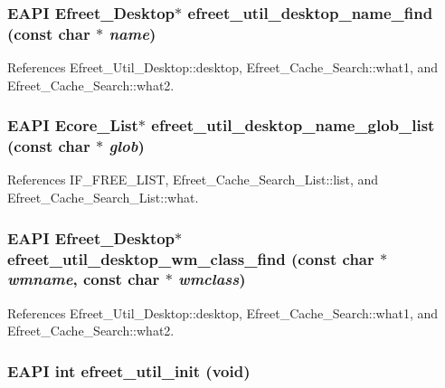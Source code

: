 \subsubsection{\setlength{\rightskip}{0pt plus 5cm}EAPI {\bf Efreet\_\-Desktop}$\ast$ efreet\_\-util\_\-desktop\_\-name\_\-find (const char $\ast$ {\em name})}\label{efreet__utils_8h_0852e1834372099771d125aff627b952}




References Efreet\_\-Util\_\-Desktop::desktop, Efreet\_\-Cache\_\-Search::what1, and Efreet\_\-Cache\_\-Search::what2.
\subsubsection{\setlength{\rightskip}{0pt plus 5cm}EAPI Ecore\_\-List$\ast$ efreet\_\-util\_\-desktop\_\-name\_\-glob\_\-list (const char $\ast$ {\em glob})}\label{efreet__utils_8h_4e1a01c2e8375828de99e6b91187278d}




References IF\_\-FREE\_\-LIST, Efreet\_\-Cache\_\-Search\_\-List::list, and Efreet\_\-Cache\_\-Search\_\-List::what.
\subsubsection{\setlength{\rightskip}{0pt plus 5cm}EAPI {\bf Efreet\_\-Desktop}$\ast$ efreet\_\-util\_\-desktop\_\-wm\_\-class\_\-find (const char $\ast$ {\em wmname}, \/  const char $\ast$ {\em wmclass})}\label{efreet__utils_8h_3ba379dbad362695a66be9e0ae6bd7df}




References Efreet\_\-Util\_\-Desktop::desktop, Efreet\_\-Cache\_\-Search::what1, and Efreet\_\-Cache\_\-Search::what2.
\subsubsection{\setlength{\rightskip}{0pt plus 5cm}EAPI int efreet\_\-util\_\-init (void)}\label{efreet__utils_8h_0457c008b4cdfac5d753319d0dd65d76}





